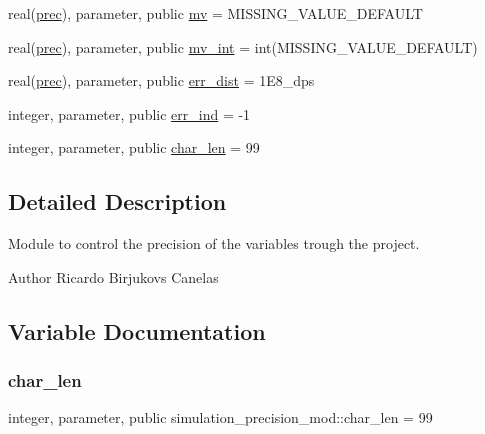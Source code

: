 \begin{DoxyCompactItemize}
\item 
real(\mbox{\hyperlink{namespacesimulation__precision__mod_aaff1ddf996761a1e11e787d63e1612f6}{prec}}), parameter, public \mbox{\hyperlink{namespacesimulation__precision__mod_a39845d8a0d331a7b9225feb5fe19ba3b}{mv}} = M\+I\+S\+S\+I\+N\+G\+\_\+\+V\+A\+L\+U\+E\+\_\+\+D\+E\+F\+A\+U\+LT
\item 
real(\mbox{\hyperlink{namespacesimulation__precision__mod_aaff1ddf996761a1e11e787d63e1612f6}{prec}}), parameter, public \mbox{\hyperlink{namespacesimulation__precision__mod_abcad51274c804cb573d8f5720c5dfa05}{mv\+\_\+int}} = int(M\+I\+S\+S\+I\+N\+G\+\_\+\+V\+A\+L\+U\+E\+\_\+\+D\+E\+F\+A\+U\+LT)
\item 
real(\mbox{\hyperlink{namespacesimulation__precision__mod_aaff1ddf996761a1e11e787d63e1612f6}{prec}}), parameter, public \mbox{\hyperlink{namespacesimulation__precision__mod_ae3222dd2d51f6b7221be1ca1c70e3e6c}{err\+\_\+dist}} = 1\+E8\+\_\+dps
\item 
integer, parameter, public \mbox{\hyperlink{namespacesimulation__precision__mod_a82a4b689dc26018c961193b991c489d4}{err\+\_\+ind}} = -\/1
\item 
integer, parameter, public \mbox{\hyperlink{namespacesimulation__precision__mod_a8a3305091ff953708508525398aa7129}{char\+\_\+len}} = 99
\end{DoxyCompactItemize}


\subsection{Detailed Description}
Module to control the precision of the variables trough the project. 

\begin{DoxyAuthor}{Author}
Ricardo Birjukovs Canelas 
\end{DoxyAuthor}


\subsection{Variable Documentation}
\mbox{\label{namespacesimulation__precision__mod_a8a3305091ff953708508525398aa7129}} 
\subsubsection{\texorpdfstring{char\+\_\+len}{char\_len}}
{\footnotesize\ttfamily integer, parameter, public simulation\+\_\+precision\+\_\+mod\+::char\+\_\+len = 99}



